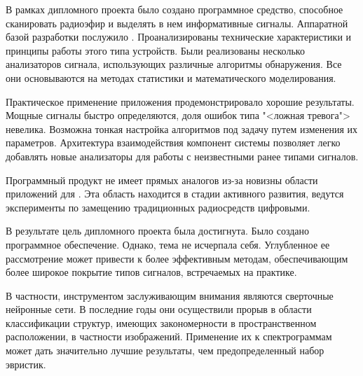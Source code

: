 
В рамках дипломного проекта было создано программное средство, способное сканировать радиоэфир и выделять в нем информативные сигналы.
Аппаратной базой разработки послужило \sdr. Проанализированы технические характеристики и принципы работы этого типа устройств.
Были реализованы несколько анализаторов сигнала, использующих различные алгоритмы обнаружения. Все они основываются на методах статистики и математического моделирования.

Практическое применение приложения продемонстрировало хорошие результаты. Мощные сигналы быстро определяются, доля ошибок типа "<ложная тревога"> невелика. Возможна тонкая настройка алгоритмов под задачу путем изменения их параметров.
Архитектура взаимодействия компонент системы позволяет легко добавлять новые анализаторы для работы с неизвестными ранее типами сигналов.

Программный продукт не имеет прямых аналогов из-за новизны области приложений для \SDR. Эта область находится в стадии активного развития, ведутся эксперименты по замещению традиционных радиосредств цифровыми.

В результате цель дипломного проекта была достигнута.
Было создано программное обеспечение.
Однако, тема не исчерпала себя. Углубленное ее рассмотрение может привести к более эффективным методам, обеспечивающим более широкое покрытие типов сигналов, встречаемых на практике.

В частности, инструментом заслуживающим внимания являются сверточные нейронные сети. В последние годы они осуществили прорыв в области классификации структур, имеющих закономерности в пространственном расположении, в частности изображений. Применение их к спектрограммам может дать значительно лучшие результаты, чем предопределенный набор эвристик.
